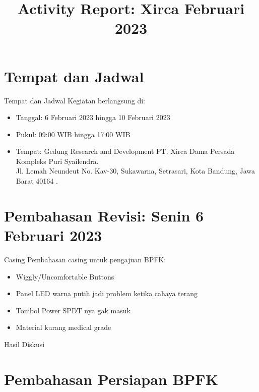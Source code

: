 \documentclass[table,dvipsnames]{beamer}
\title[Xirca042022]{Activity Report: Xirca Februari 2023}
\author{}
\institute[VibrasticLab : \ccbysa]{
    Achmadi ST MT
}
\date{}
\begin{document}
    \begin{frame}
        \titlepage
    \end{frame}

    \section{Tempat dan Jadwal}
    \begin{frame}
        \begin{exampleblock}{Tempat dan Jadwal}
            Kegiatan berlangsung di:
            \begin{itemize}
                \item Tanggal: 6 Februari 2023 hingga 10 Februari 2023
                \item Pukul: 09:00 WIB hingga 17:00 WIB
                \item Tempat: Gedung Research and Development PT. Xirca Dama Persada\\
                Kompleks Puri Syailendra.\\
                Jl. Lemah Neundeut No. Kav-30, Sukawarna, Setrasari, Kota Bandung, Jawa Barat 40164 .
            \end{itemize}
        \end{exampleblock}
    \end{frame}

    \section{Pembahasan Revisi: Senin 6 Februari 2023}
    \begin{exampleblock}{Casing}
        Pembahasan casing untuk pengajuan BPFK:
        \begin{itemize}
            \item Wiggly/Uncomfortable Buttons
            \item Panel LED warna putih jadi problem ketika cahaya terang
            \item Tombol Power SPDT nya gak masuk
            \item Material kurang medical grade
        \end{itemize}
    \end{exampleblock}

    \begin{exampleblock}{Hasil Diskusi}

    \end{exampleblock}

    \section{Pembahasan Persiapan BPFK}
    \begin{exampleblock}{}

    \end{exampleblock}
\end{document}
